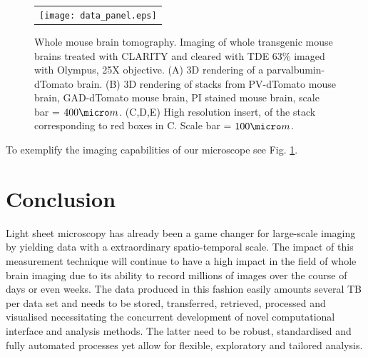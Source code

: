 \documentclass[12pt]{spieman}  %
\begin{document}
	\begin{figure}
   \begin{center}
   \begin{tabular}{c}
   \texttt{[image: data\_panel.eps]}
   \end{tabular}
   \end{center}
   \caption{\label{fig:LSMdata} Whole mouse brain tomography. Imaging of whole transgenic mouse brains treated with CLARITY and cleared with TDE 63\% imaged with Olympus, 25X objective. (A) 3D rendering of a parvalbumin-dTomato brain. (B) 3D rendering of stacks from PV-dTomato mouse brain, GAD-dTomato mouse brain,  PI stained mouse brain, scale bar = $400 \micro m$. (C,D,E) High resolution insert, of the stack corresponding to red boxes in C. Scale bar = $100 \micro m$.} 
   \end{figure}
	
	To exemplify the imaging capabilities of our microscope see Fig. \ref{fig:LSMdata}. 

\section{Conclusion}

Light sheet microscopy has already been a game changer for large-scale imaging by yielding data with a extraordinary spatio-temporal scale. The impact of this measurement technique will continue to have a high impact in the field of whole brain imaging due to its ability to record millions of images over the course of days or even weeks. The data produced in this fashion easily amounts several TB per data set and needs to be stored, transferred, retrieved, processed and visualised necessitating the concurrent development of novel computational interface and analysis methods. The latter need to be robust, standardised and fully automated processes yet allow for flexible, exploratory and tailored analysis. 
\end{document}
